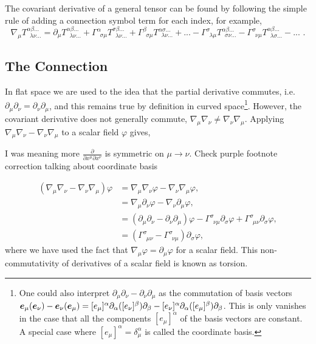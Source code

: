 The covariant derivative of a general tensor can be found by following the simple rule of adding a connection symbol term for each index, for example,
\begin{equation}
\nabla_\mu T^{\alpha\beta ...}_{\,\,\,\lambda\nu ...} = \partial_\mu T^{\alpha\beta ...}_{\,\,\,\lambda\nu ...}
+ \Gamma^{\alpha}_{\,\,\,\sigma \mu} T^{\sigma\beta ...}_{\,\,\,\lambda\nu ...} + \Gamma^{\beta}_{\,\,\,\sigma\mu} T^{\alpha\sigma ...}_{\,\,\,\lambda\nu ...} + ...
- \Gamma^{\sigma}_{\,\,\,\lambda\mu} T^{\alpha\beta ...}_{\,\,\,\sigma\nu ...} - \Gamma^{\sigma}_{\,\,\,\nu\mu} T^{\alpha\beta ...}_{\,\,\,\lambda\sigma ...} - ...
\,\,.\end{equation}



\subsection{The Connection}\label{intro:sec:levicivita}

In flat space we are used to the idea that the partial derivative commutes, i.e.
$\partial_\mu \partial_\nu = \partial_\nu \partial_\mu$, and this remains true
by definition in curved space\footnote{\color{orchid}
One could also interpret $\partial_\mu \partial_\nu- \partial_\nu\partial_\mu$ as
the commutation of basis vectors $\boldsymbol{e}_\mu(\boldsymbol{e}_\nu)-\boldsymbol{e}_\nu(\boldsymbol{e}_\mu) =
[e_\mu]^\alpha \partial_\alpha ([e_\nu]^\beta)\partial_\beta -
[e_\nu]^\alpha \partial_\alpha ([e_\mu]^\beta)\partial_\beta$. This is only vanishes
in the case that all the components $[e_\mu]^\alpha$ of the basis vectors are
constant. A special case where $[e_\mu]^\alpha = \delta^\alpha_\mu$ is called the coordinate basis.
}.
However, the covariant derivative does not generally
commute, $\nabla_\mu \nabla_\nu \neq \nabla_\nu \nabla_\mu$. Applying
$\nabla_\mu \nabla_\nu - \nabla_\nu \nabla_\mu$ to a scalar field $\varphi$ gives,

\color{choral} I was meaning
more $\frac{\partial}{\partial x^\mu \partial x^\nu}$ is symmetric on $\mu \rightarrow \nu$.
Check purple footnote correction talking about coordinate basis \color{black}

\begin{align}
(\nabla_\mu \nabla_\nu  - \nabla_\nu \nabla_\mu )\varphi &= \nabla_\mu \nabla_\nu \varphi - \nabla_\nu \nabla_\mu \varphi , \\
                                               &= \nabla_\mu \partial_\nu \varphi - \nabla_\nu \partial_\mu \varphi , \\
                                               &= (\partial_\mu \partial_\nu  - \partial_\nu \partial_\mu )\varphi -  \Gamma^{\sigma}_{\,\,\,\nu\mu} \partial_\sigma \varphi + \Gamma^{\sigma}_{\,\,\,\mu\nu} \partial_\sigma \varphi,\\
                                               &=(\Gamma^{\sigma}_{\,\,\,\mu\nu}  - \Gamma^{\sigma}_{\,\,\,\nu\mu}) \partial_\sigma \varphi,
\end{align}
where we have used the fact that $\nabla_\mu \varphi = \partial_\mu \varphi$ for a scalar field. This non-commutativity of derivatives of a scalar field is known as torsion.

